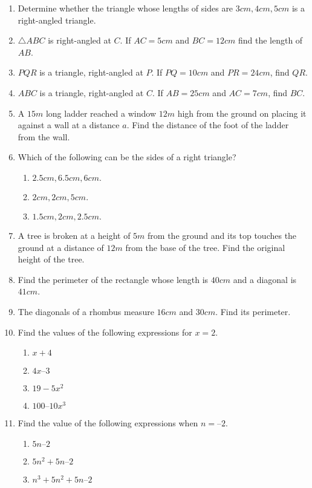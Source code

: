 \begin{enumerate}[label=\thesection.\arabic*, ref=\thesection.\theenumi]
\item Determine whether the triangle whose lengths of sides are $3 cm, 4 cm, 5 cm$ is a right-angled triangle.
\item $\triangle ABC$ is right-angled at $C$. If $AC = 5 cm$ and $BC = 12 cm$ find the length of $AB$.
\item $PQR$ is a triangle, right-angled at $P$. If $PQ = 10cm$ and $PR = 24 cm$, find $QR$.
\item $ABC$ is a triangle, right-angled at $C$. If $AB = 25 cm$ and $AC = 7 cm$, find $BC$.
\item A $15 m$ long ladder reached a window $12 m$ high from the ground on placing it against a wall at a distance $a$. Find the distance of the foot of the ladder from the wall.
\item  Which of the following can be the sides of a right triangle? 
\begin{enumerate}
	\item $2.5 cm,6.5 cm, 6 cm.$ 
	\item $ 2 cm, 2 cm, 5 cm.$ 
	\item $ 1.5 cm, 2cm, 2.5 cm.$
\end{enumerate}
\item A tree is broken at a height of $5 m$ from the ground and its top touches the ground at a distance of $12 m$ from the base of the tree. Find the original height of the tree.
\item Find the perimeter of the rectangle whose length is $40 cm$ and a diagonal is $41 cm$. 
\item The diagonals of a rhombus measure $16 cm$ and $30 cm$. Find its perimeter.
\item Find the values of the following expressions for $x = 2$. 
	\begin{enumerate}
\item $x + 4$
\item  $4x – 3$ 
\item  $19-5x^2$
\item  $100 – 10x^3$
	\end{enumerate}
\item Find the value of the following expressions when $n = – 2.$ 
	\begin{enumerate}
\item $5n – 2$
\item  $5n^2 + 5n – 2 $
\item  $n^3 + 5n^2 + 5n – 2$

\end{enumerate}
\end{enumerate}
